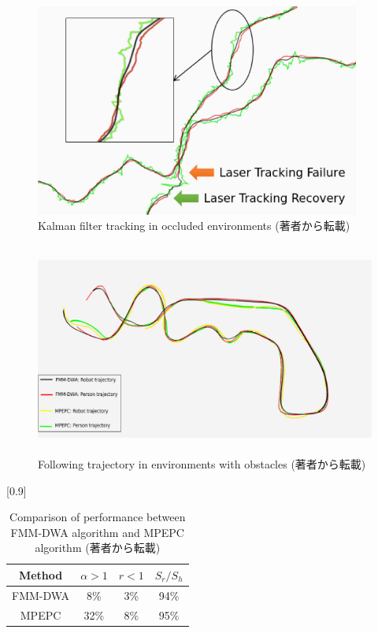 \begin{figure}[h]
  \begin{center}
  \includegraphics[height=70mm,clip]{figure/2-3_aoaANDlaser.png}
  \caption{Kalman filter tracking in occluded environments
  (著者\cite{A Robust Autonomous Following Method for Mobile Robots in Dynamic Environments}から転載)}
  \label{2-3_aoaANDlaser}
  \end{center}
\end{figure}

\begin{figure}[h]
  \begin{center}
  \includegraphics[height=70mm,clip]{figure/2-3_result.png}
  \caption{Following trajectory in environments with obstacles
  (著者\cite{A Robust Autonomous Following Method for Mobile Robots in Dynamic Environments}から転載)}
  \label{2-3_result}
  \end{center}
\end{figure}

\begin{table}[h]
  \begin{center}
    \caption{{Comparison of performance between FMM-DWA algorithm and MPEPC algorithm
    (著者\cite{A Robust Autonomous Following Method for Mobile Robots in Dynamic Environments}から転載)}
    \label{2-3_result_table}}
    \scalebox{1.1}[0.9]{
      \begin{tabular}{c|c|c|c} \hline
        Method & $\alpha > 1$ & $r < 1$ & $S_r / S_h$ \\ \hline
        FMM-DWA & 8\% & 3\% & 94\% \\ \hline
        MPEPC & 32\% & 8\% & 95\% \\ \hline
      \end{tabular}
    }
  \end{center}
\end{table}

